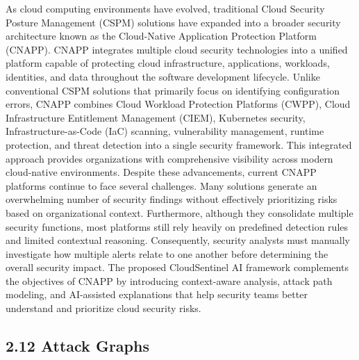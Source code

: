As cloud computing environments have evolved, traditional Cloud Security Posture Management (CSPM) solutions have expanded into a broader security architecture known as the Cloud-Native Application Protection Platform (CNAPP). CNAPP integrates multiple cloud security technologies into a unified platform capable of protecting cloud infrastructure, applications, workloads, identities, and data throughout the software development lifecycle. Unlike conventional CSPM solutions that primarily focus on identifying configuration errors, CNAPP combines Cloud Workload Protection Platforms (CWPP), Cloud Infrastructure Entitlement Management (CIEM), Kubernetes security, Infrastructure-as-Code (IaC) scanning, vulnerability management, runtime protection, and threat detection into a single security framework. This integrated approach provides organizations with comprehensive visibility across modern cloud-native environments. Despite these advancements, current CNAPP platforms continue to face several challenges. Many solutions generate an overwhelming number of security findings without effectively prioritizing risks based on organizational context. Furthermore, although they consolidate multiple security functions, most platforms still rely heavily on predefined detection rules and limited contextual reasoning. Consequently, security analysts must manually investigate how multiple alerts relate to one another before determining the overall security impact. The proposed CloudSentinel AI framework complements the objectives of CNAPP by introducing context-aware analysis, attack path modeling, and AI-assisted explanations that help security teams better understand and prioritize cloud security risks.

\subsection{2.12 Attack Graphs}

